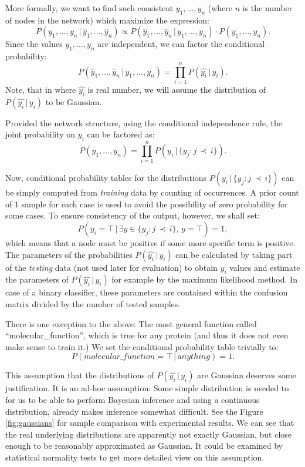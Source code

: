 \documentclass[11pt,twoside,a4paper]{book}
\begin{document}
More formally, we want to find such consistent $y_1, ..., y_n$
(where $n$ is the number of nodes in the network)
which maximize the expression:
\[P(y_1, ..., y_n \,|\, \hat{y}_1, ..., \hat{y}_n) \propto P(\hat{y}_1, ..., \hat{y}_n\, | \, y_1, ..., y_n) \cdot P(y_1, ..., y_n). \]
Since the values $y_1, ..., y_n$ are independent, we can factor the conditional probability:
\[P(\hat{y}_1, ..., \hat{y}_n\, |\, y_1, ..., y_n) = \prod_{i=1}^n P(\hat{y_i} \,|\,y_i). \]
Note, that in where $\hat{y_i}$ is real number,
we will assume the distribution of $P(\hat{y_i}\,|\,y_i)$ to be Gaussian.

Provided the network structure, using the conditional independence rule,
the joint probability on $y_i$ can be factored as:
\[ P(y_1, ..., y_n) = \prod_{i=1}^n P(y_i\,|\,\{y_j : j  \,  \prec \,  i\}). \]

Now, conditional probability tables for the distributions $P(y_i\,|\,\{y_j : j  \,  \prec \,  i\})$ 
can be simply computed from \emph{training} data by counting of occurrences.
A prior count of 1 sample for each case is used to avoid the 
possibility of zero probability for some cases.
To ensure consistency of the output, however, 
we shall set:
\[ P(y_i = \top \, | \, \exists y \in \{y_j : j  \,  \prec \,  i\}, \, y = \top  ) = 1, \]
which means that a node must be positive if some more specific term is positive.
The parameters of the probabilities $P(\hat{y_i}\,|\,y_i)$ can be
calculated by taking part of the \emph{testing} data
(not used later for evaluation) to
obtain $y_i$ values and estimate the parameters of $P(\hat{y_i}\,|\,y_i)$
for example by the maximum likelihood method.
In case of a binary classifier, 
these parameters are contained within the confusion matrix divided 
by the number of tested samples.

There is one exception to the above: 
The most general function called ``molecular\_function'',
which is true for any protein
(and thus it does not even make sense to train it.)
We set the conditional probability table trivially to:
\[ P(molecular\_function = \top \,|\, anything ) = 1. \]

This assumption that the distributions of $P(\hat{y_i}\,|\,y_i)$ are Gaussian  
deserves some justification.
It is an ad-hoc assumption:
Some simple distribution is needed to for us
to be able to perform Bayesian inference
and using a continuous distribution,
already makes inference somewhat difficult.
See the Figure \ref{fig:gaussians}
for sample comparison with experimental results.
We can see that the real underlying distributions are apparently not exactly Gaussian,
but close enough to be reasonably approximated as Gaussian.
It could be examined by statistical normality tests to get more detailed view on this assumption.
\end{document}
